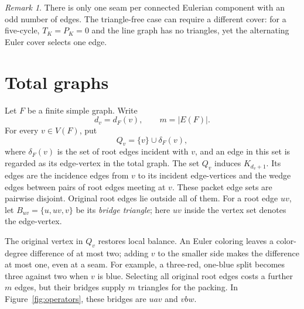 \documentclass[11pt]{article}
\theoremstyle{remark}
\newtheorem{remark}[theorem]{Remark}
\begin{document}
\begin{remark}
There is only one seam per connected Eulerian component with an odd number
of edges.  The triangle-free case can require a different cover: for a
five-cycle, $T_K=P_K=0$ and the line graph has no triangles, yet the
alternating Euler cover selects one edge.
\end{remark}

\section{Total graphs}\label{sec:total}

Let $F$ be a finite simple graph.  Write
\[
  d_v=d_F(v),\qquad m=|E(F)|.
\]
For every $v\in V(F)$, put
\[
  Q_v=\{v\}\cup\delta_F(v),
\]
where $\delta_F(v)$ is the set of root edges incident with $v$, and an edge
in this set is regarded as its edge-vertex in the total
graph.  The set $Q_v$ induces $K_{d_v+1}$.  Its edges are the incidence
edges from $v$ to its incident edge-vertices and the wedge edges between
pairs of root edges meeting at $v$.  These packet edge sets are pairwise
disjoint.  Original root edges lie outside all of them.
For a root edge $uv$, let $B_{uv}=\{u,uv,v\}$ be its \emph{bridge triangle};
here $uv$ inside the vertex set denotes the edge-vertex.

The original vertex in $Q_v$ restores local balance.  An Euler coloring
leaves a color-degree difference of at most two; adding $v$ to the smaller
side makes the difference at most one, even at a seam.  For example, a
three-red, one-blue split becomes three against two when $v$ is blue.
Selecting all original root edges costs a further $m$ edges, but their
bridges supply $m$ triangles for the packing.  In
Figure~\ref{fig:operators}, these bridges are $uav$ and $vbw$.
\end{document}
